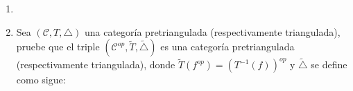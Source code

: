 \documentclass{article}
\begin{document}
\begin{enumerate}
\begin{proof}
\begin{enumerate}
\item Suponga que $g$ y $h$ son isos en $\mathscr{C}$. Una vez mas se tiene la siguiente configuración inicial:

\begin{center}
\end{center}

después de aplicar una rotaci\'on a la derecha (por TR2) a los triángulos $\eta$ y $\mu$, se obtiene la siguiente situaci\'on:

\begin{center}
\end{center}

observe que $Tg \circ Tu=Ta\circ Tf$ por lo que $Tg \circ -Tu=-Ta\circ Tf$, dado que $g$ y $h$ son isos, se cuenta con las hipótesis necesarias para concluir que $Tf$ es un iso en $\mathscr{C}$ y como $T^{-1}$ es funtor (es decir preserva isos) se sigue que $f=T^{-1}(Tf)$ es un iso en $\mathscr{C}$. 
\end{enumerate}
\end{proof}


\item
\item Sea $(\mathscr{C},T,\triangle)$ una categoría pretriangulada (respectivamente triangulada), pruebe que el triple 
$(\mathscr{C}^{op},\tilde{T},\tilde{\triangle})$ es una categoría pretriangulada (respectivamente triangulada), donde 
$\tilde{T}(f^{op})=(T^{-1}(f))^{op}$ y $\tilde{\triangle}$ se define como sigue:\\
\centerline{
}\\


\end{enumerate}
\end{document}
